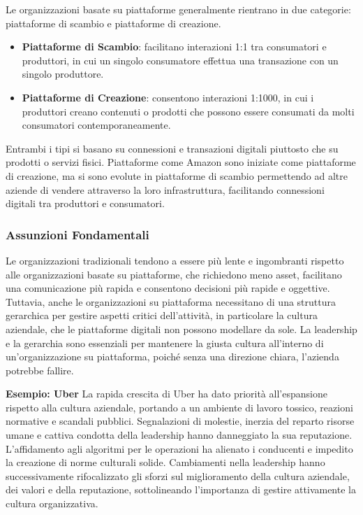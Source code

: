 \documentclass{article}
\begin{document}
Le organizzazioni basate su piattaforme generalmente rientrano in due categorie: piattaforme di scambio e piattaforme di creazione.

\begin{itemize}
    \item \textbf{Piattaforme di Scambio}: facilitano interazioni 1:1 tra consumatori e produttori, in cui un singolo consumatore effettua una transazione con un singolo produttore.
    \item \textbf{Piattaforme di Creazione}: consentono interazioni 1:1000, in cui i produttori creano contenuti o prodotti che possono essere consumati da molti consumatori contemporaneamente.
\end{itemize}

Entrambi i tipi si basano su connessioni e transazioni digitali piuttosto che su prodotti o servizi fisici. Piattaforme come Amazon sono iniziate come piattaforme di creazione, ma si sono evolute in piattaforme di scambio permettendo ad altre aziende di vendere attraverso la loro infrastruttura, facilitando connessioni digitali tra produttori e consumatori.

\subsubsection{Assunzioni Fondamentali}

Le organizzazioni tradizionali tendono a essere più lente e ingombranti rispetto alle organizzazioni basate su piattaforme, che richiedono meno asset, facilitano una comunicazione più rapida e consentono decisioni più rapide e oggettive. Tuttavia, anche le organizzazioni su piattaforma necessitano di una struttura gerarchica per gestire aspetti critici dell'attività, in particolare la cultura aziendale, che le piattaforme digitali non possono modellare da sole. La leadership e la gerarchia sono essenziali per mantenere la giusta cultura all'interno di un'organizzazione su piattaforma, poiché senza una direzione chiara, l'azienda potrebbe fallire.

\textbf{Esempio: Uber} \newline
La rapida crescita di Uber ha dato priorità all'espansione rispetto alla cultura aziendale, portando a un ambiente di lavoro tossico, reazioni normative e scandali pubblici. Segnalazioni di molestie, inerzia del reparto risorse umane e cattiva condotta della leadership hanno danneggiato la sua reputazione. L'affidamento agli algoritmi per le operazioni ha alienato i conducenti e impedito la creazione di norme culturali solide. Cambiamenti nella leadership hanno successivamente rifocalizzato gli sforzi sul miglioramento della cultura aziendale, dei valori e della reputazione, sottolineando l'importanza di gestire attivamente la cultura organizzativa.
\end{document}
